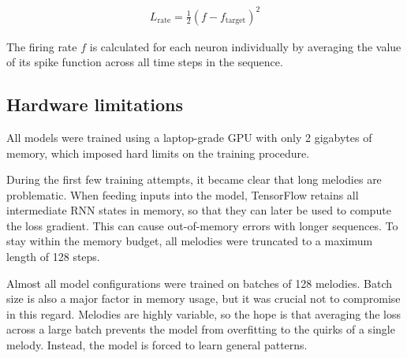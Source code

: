 \documentclass[../../report.tex]{subfiles}
\begin{document}
\begin{align*}
  L_\mathrm{rate} = \frac{1}{2} (f - f_\mathrm{target})^2
\end{align*}

The firing rate \(f\) is calculated for each neuron individually by averaging
the value of its spike function across all time steps in the sequence.

\subsection{Hardware limitations}

All models were trained using a laptop-grade GPU with only 2 gigabytes of
memory, which imposed hard limits on the training procedure.

During the first few training attempts, it became clear that long melodies are
problematic. When feeding inputs into the model, TensorFlow retains all
intermediate RNN states in memory, so that they can later be used to compute the
loss gradient. This can cause out-of-memory errors with longer sequences. To
stay within the memory budget, all melodies were truncated to a maximum length
of 128 steps.

Almost all model configurations were trained on batches of 128 melodies. Batch
size is also a major factor in memory usage, but it was crucial not to
compromise in this regard. Melodies are highly variable, so the hope is that
averaging the loss across a large batch prevents the model from overfitting to
the quirks of a single melody. Instead, the model is forced to learn general
patterns.
\end{document}

